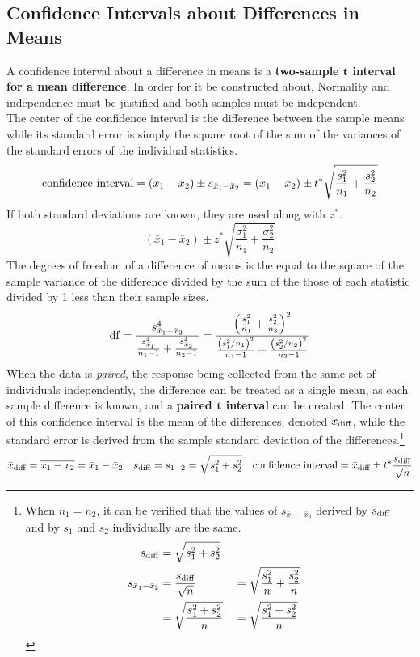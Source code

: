 \documentclass[../AP_Statistics.tex]{subfiles}
\begin{document}
			\subsection*{Confidence Intervals about Differences in Means}
				A confidence interval about a difference in means is a \textbf{two-sample $\bm{t}$ interval for a mean difference}. In order for it be constructed about, Normality and independence must be justified and both samples must be independent. \\
				The center of the confidence interval is the difference between the sample means while its standard error is simply the square root of the sum of the variances of the standard errors of the individual statistics.
				\[\text{confidence interval} = (x_1 - x_2) \pm s_{\bar{x}_1 - \bar{x}_2} = (\bar{x}_1 - \bar{x}_2) \pm t^*\sqrt{\frac{s_1^2}{n_1} + \frac{s_2^2}{n_2}}\]
				If both standard deviations are known, they are used along with $z^*$.
				\[(\bar{x}_1 - \bar{x}_2) \pm z^*\sqrt{\frac{\sigma_1^2}{n_1} +\frac{\sigma_2^2}{n_2}}\]
				The degrees of freedom of a difference of means is the equal to the square of the sample variance of the difference divided by the sum of the those of each statistic divided by 1 less than their sample sizes.
				\[\operatorname{\mathrm{df}} = \frac{s_{\bar{x}_1 - \bar{x}_2}^4}{\frac{s_{\bar{x}_1}^4}{n_1 - 1} + \frac{s_{\bar{x}_2}^4}{n_2 - 1}} = \frac{\left(\frac{s_1^2}{n_1} + \frac{s_2^2}{n_2}\right)^2}{\frac{\left(s_1^2/n_1\right)^2}{n_1 - 1} + \frac{\left(s_2^2/n_2\right)^2}{n_2 - 1}}\]
				When the data is \emph{paired}, the response being collected from the same set of individuals independently, the difference can be treated as a single mean, as each sample difference is known, and a \textbf{paired $\bm{t}$ interval} can be created. The center of this confidence interval is the mean of the differences, denoted $\bar{x}_{\mathrm{diff}}$, while the standard error is derived from the sample standard deviation of the differences.\footnote{
					When $n_1 = n_2$, it can be verified that the values of $s_{\bar{x}_1 - \bar{x}_2}$ derived by $s_{\mathrm{diff}}$ and by $s_1$ and $s_2$ individually are the same.
					\begin{align*}
						s_{\mathrm{diff}} &= \sqrt{s_1^2 + s_2^2} \\
						s_{\bar{x}_1 - \bar{x}_2} &= \frac{s_{\mathrm{diff}}}{\sqrt{n}} & &= \sqrt{\frac{s_1^2}{n} + \frac{s_2^2}{n}} \\
							&= \sqrt{\frac{s_1^2 + s_2^2}{n}} & &= \sqrt{\frac{s_1^2 + s_2^2}{n}}\\
					\end{align*}
					}
				\begin{align*}
					\bar{x}_{\mathrm{diff}} &= \overline{x_1 - x_2} = \bar{x}_1 - \bar{x}_2 & s_{\mathrm{diff}} &= s_{1 - 2} = \sqrt{s_1^2 + s_2^2} &\text{confidence interval} = \bar{x}_{\mathrm{diff}} \pm t^*\frac{s_{\mathrm{diff}}}{\sqrt{n}}
				\end{align*}
\end{document}
